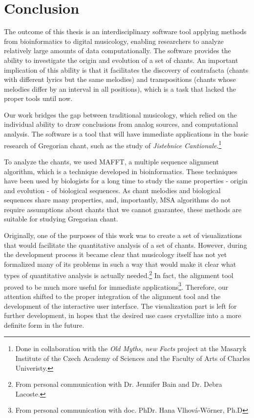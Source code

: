 \chapter*{Conclusion}

The outcome of this thesis is an interdisciplinary software tool applying methods from bioinformatics to digital musicology, enabling researchers
to analyze relatively large amounts of data computationally. The software
provides the ability to investigate the origin and evolution of a set of chants. An important implication of this ability is that it facilitates
the discovery of contrafacta (chants with different lyrics but the same melodies) and transpositions (chants whose melodies differ by an interval
in all positions), which is a task that lacked the proper tools until now.

Our work bridges the gap between traditional musicology,
which relied on the individual ability to draw conclusions from analog sources, and computational analysis. The software is a tool
that will have immediate applications in the basic research of Gregorian chant, such as the study of \emph{Jistebnice Cantionale}.\footnote{
Done in collaboration with the \emph{Old Myths, new Facts} project at the Masaryk Institute of the Czech Academy of Sciences and the Faculty
of Arts of Charles Univeristy.}

To analyze the chants, we used MAFFT, a multiple sequence alignment algorithm, which is a technique developed in bioinformatics. These techniques have been used by
biologists for a long time to study the same properties - origin and evolution - of biological sequences. As chant melodies and biological sequences
share many properties, and, importantly, MSA algorithms do not require assumptions about chants that we cannot guarantee, these methods are suitable
for studying Gregorian chant.

Originally, one of the purposes of this work was to create a set of visualizations that would facilitate the quantitative analysis of a set of chants.
However, during the development process it became clear that musicology itself has not yet formalized many of its problems in such a way that 
would make it clear what types of quantitative analysis is actually needed.\footnote{From personal communication with Dr. Jennifer Bain and Dr.
Debra Lacoste.} In fact, the alignment tool proved to be much more useful for immediate
applications\footnote{From personal communication with doc. PhDr. Hana Vlhová-Wörner, Ph.D}. Therefore, our attention shifted to the proper
integration of the alignment tool and the development of the interactive user interface. The visualization part is left for further development,
in hopes that the desired use cases crystallize into a more definite form in the future.

